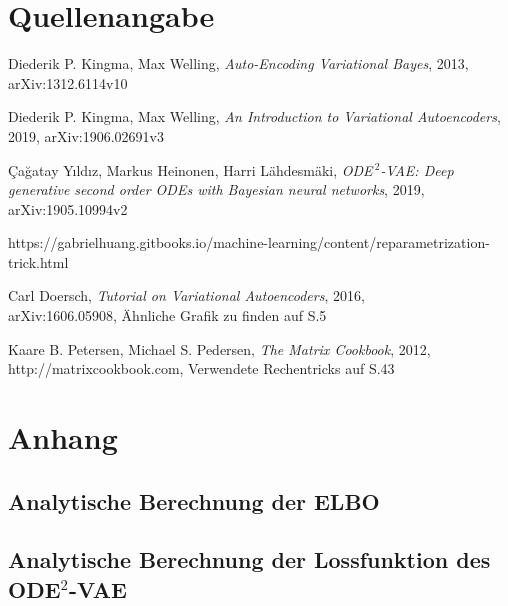 \documentclass[12pt]{article}
\begin{document}
	\section[Quellenangabe]{Quellenangabe}
	\begin{thebibliography}{9}
		Diederik P. Kingma, Max Welling,
		\textit{Auto-Encoding Variational Bayes},
		2013,\\
		arXiv:1312.6114v10
		
		Diederik P. Kingma, Max Welling,
		\textit{An Introduction to Variational Autoencoders}, 
		2019,
		arXiv:1906.02691v3
		
		Çağatay Yıldız, Markus Heinonen, Harri Lähdesmäki,
		\textit{ODE$^{\ 2}$-VAE: Deep generative second order ODEs with Bayesian neural networks}, 
		2019,
		arXiv:1905.10994v2
		
		https://gabrielhuang.gitbooks.io/machine-learning/content/reparametrization-trick.html

		Carl Doersch,
		\textit{Tutorial on Variational Autoencoders},
		2016,\\
		arXiv:1606.05908,
		Ähnliche Grafik zu finden auf S.5

		Kaare B. Petersen, Michael S. Pedersen,
		\textit{The Matrix Cookbook},
		2012,
		http://matrixcookbook.com, Verwendete Rechentricks auf S.43

	\end{thebibliography}
	\section[Anhang]{Anhang}
	\subsection[Analytische Berechnung der ELBO]{Analytische Berechnung der ELBO}
	\subsection[Analytische Berechnung der Lossfunktion des ODE$^2$-VAE]{Analytische Berechnung der Lossfunktion des ODE$^2$-VAE}
\end{document}
